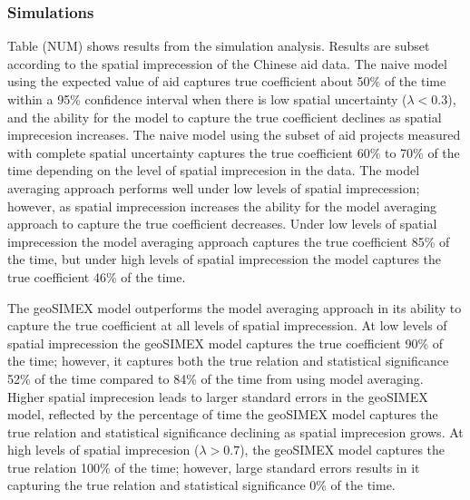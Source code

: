 \subsubsection{Simulations}

Table (NUM) shows results from the simulation analysis. Results are subset according to the spatial imprecession of the Chinese aid data. The naive model using the expected value of aid captures true coefficient about 50\% of the time within a 95\% confidence interval when there is low spatial uncertainty ($\lambda < 0.3$), and the ability for the model to capture the true coefficient declines as spatial imprecesion increases. The naive model using the subset of aid projects measured with complete spatial uncertainty captures the true coefficient 60\% to 70\% of the time depending on the level of spatial imprecesion in the data. The model averaging approach performs well under low levels of spatial imprecession; however, as spatial imprecession increases the ability for the model averaging approach to capture the true coefficient decreases. Under low levels of spatial imprecession the model averaging approach captures the true coefficient 85\% of the time, but under high levels of spatial imprecession the model captures the true coefficient 46\% of the time. 
\par
The geoSIMEX model outperforms the model averaging approach in its ability to capture the true coefficient at all levels of spatial imprecession. At low levels of spatial imprecession the geoSIMEX model captures the true coefficient 90\% of the time; however, it captures both the true relation and statistical significance 52\% of the time compared to 84\% of the time from using model averaging. Higher spatial imprecesion leads to larger standard errors in the geoSIMEX model, reflected by the percentage of time the geoSIMEX model captures the true relation and statistical significance declining as spatial imprecesion grows. At high levels of spatial imprecesion ($\lambda > 0.7$), the geoSIMEX model captures the true relation 100\% of the time; however, large standard errors results in it capturing the true relation and statistical significance 0\% of the time.   


